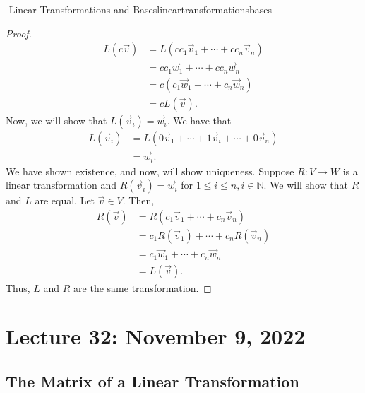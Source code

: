 \begin{theorem}{\Stop\,\,Linear Transformations and Bases}{lineartransformationsbases}
\begin{proof}
\begin{align*}
                    L(c\vec{v})&=L(cc_1\vec{v}_1+\cdots+cc_n\vec{v}_n) \\
                    &=cc_1\vec{w}_1+\cdots+cc_n\vec{w}_n \\
                    &=c(c_1\vec{w}_1+\cdots+c_n\vec{w}_n) \\
                    &=cL(\vec{v}).
                \end{align*}
                Now, we will show that \(L(\vec{v}_i)=\vec{w}_i\). We have that
                \begin{align*}
                    L(\vec{v}_i)&=L(0\vec{v}_1+\cdots+1\vec{v}_i+\cdots+0\vec{v}_n) \\
                    &=\vec{w}_i.
                \end{align*}
                We have shown existence, and now, will show uniqueness. Suppose \(R:V\to W\) is a linear transformation and \(R(\vec{v}_i)=\vec{w}_i\) for \(1\leq i\leq n, i\in \mathbb{N}\). We will show that \(R\) and \(L\) are equal. Let \(\vec{v}\in V\). Then,
                \begin{align*}
                    R(\vec{v})&=R(c_1\vec{v}_1+\cdots+c_n\vec{v}_n) \\
                    &=c_1R(\vec{v}_1)+\cdots+c_nR(\vec{v}_n) \\
                    &=c_1\vec{w}_1+\cdots+c_n\vec{w}_n \\
                    &=L(\vec{v}).
                \end{align*}
                Thus, \(L\) and \(R\) are the same transformation.
            \end{proof}
            
            
        \end{theorem}

\pagebreak

\section{Lecture 32: November 9, 2022}

    \subsection{The Matrix of a Linear Transformation}


